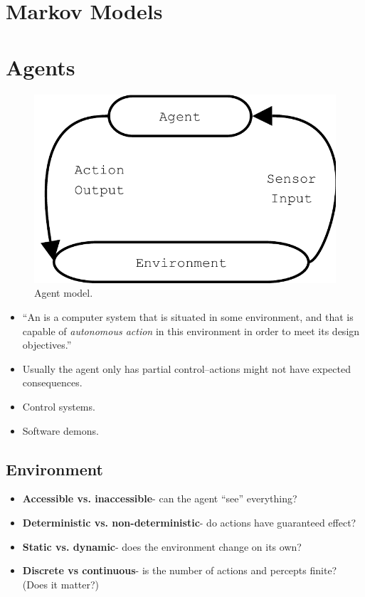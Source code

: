 \section{Markov Models}
\label{sec:markov-models}


\section{Agents}
\begin{figure}
  \includegraphics[width=\textwidth]{formalmodels/agent}
  \caption{Agent model.}
  \label{fig:agentmodel}
\end{figure}

\begin{itemize}
\item ``An  is a computer system that is situated in
  some environment, and that is capable of \emph{autonomous action} in
  this environment in order to meet its design objectives.''
  
\item Usually the agent only has partial control--actions
  might not have expected consequences.
  
\item Control systems.
  
\item Software demons. 
\end{itemize}

\subsection{Environment}
\label{sec:environment}

\begin{itemize}
\item \textbf{Accessible vs. inaccessible}- can the agent
  ``see'' everything? 
  
\item \textbf{Deterministic vs. non-deterministic}- do actions
  have guaranteed effect? 
  
  \item \textbf{Static vs. dynamic}- does the environment change on
    its own? 
    
  \item \textbf{Discrete vs continuous}- is the number of actions and
    percepts finite? (Does it matter?) 
  \end{itemize}

